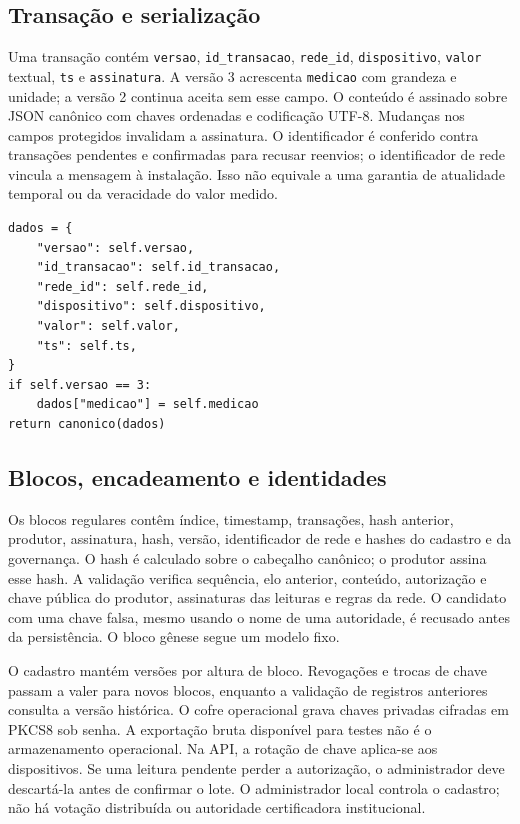 \documentclass[10pt,a4paper,twocolumn]{article}
\begin{document}
\subsection{Transação e serialização}
Uma transação contém \texttt{versao}, \texttt{id\_transacao}, \texttt{rede\_id}, \texttt{dispositivo}, \texttt{valor} textual, \texttt{ts} e \texttt{assinatura}. A versão 3 acrescenta \texttt{medicao} com grandeza e unidade; a versão 2 continua aceita sem esse campo. O conteúdo é assinado sobre JSON canônico com chaves ordenadas e codificação UTF-8. Mudanças nos campos protegidos invalidam a assinatura. O identificador é conferido contra transações pendentes e confirmadas para recusar reenvios; o identificador de rede vincula a mensagem à instalação. Isso não equivale a uma garantia de atualidade temporal ou da veracidade do valor medido.

\begin{lstlisting}[style=codigo,caption={Campos protegidos no conteúdo assinado da transação atual.},basicstyle=\ttfamily\scriptsize]
dados = {
    "versao": self.versao,
    "id_transacao": self.id_transacao,
    "rede_id": self.rede_id,
    "dispositivo": self.dispositivo,
    "valor": self.valor,
    "ts": self.ts,
}
if self.versao == 3:
    dados["medicao"] = self.medicao
return canonico(dados)
\end{lstlisting}

\subsection{Blocos, encadeamento e identidades}
Os blocos regulares contêm índice, timestamp, transações, hash anterior, produtor, assinatura, hash, versão, identificador de rede e hashes do cadastro e da governança. O hash é calculado sobre o cabeçalho canônico; o produtor assina esse hash. A validação verifica sequência, elo anterior, conteúdo, autorização e chave pública do produtor, assinaturas das leituras e regras da rede. O candidato com uma chave falsa, mesmo usando o nome de uma autoridade, é recusado antes da persistência. O bloco gênese segue um modelo fixo.

O cadastro mantém versões por altura de bloco. Revogações e trocas de chave passam a valer para novos blocos, enquanto a validação de registros anteriores consulta a versão histórica. O cofre operacional grava chaves privadas cifradas em PKCS8 sob senha. A exportação bruta disponível para testes não é o armazenamento operacional. Na API, a rotação de chave aplica-se aos dispositivos. Se uma leitura pendente perder a autorização, o administrador deve descartá-la antes de confirmar o lote. O administrador local controla o cadastro; não há votação distribuída ou autoridade certificadora institucional.
\end{document}
